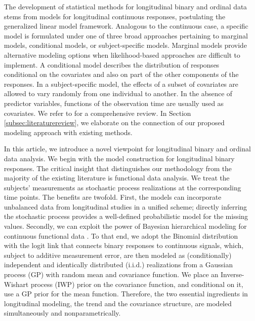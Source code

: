The development of statistical methods for longitudinal binary and ordinal data stems from 
models for longitudinal continuous responses, postulating the generalized linear model framework. 
Analogous to the continuous case, a specific model is formulated under one of three broad
approaches pertaining to marginal models, conditional models, or subject-specific models. 
Marginal models provide alternative modeling options when likelihood-based approaches are 
difficult to implement.
A conditional model describes the distribution of responses conditional on the covariates 
and also on part of the other components of the responses. In a subject-specific model, 
the effects of a subset of covariates are allowed to vary randomly from one individual 
to another. In the absence of predictor variables, functions of the observation time are 
usually used as covariates. We refer to \citet{Molenberghs2006} for a comprehensive review. 
In Section \ref{subsec:literaturereview}, we elaborate on the connection of our 
proposed modeling approach with existing methods.


In this article, we introduce a novel viewpoint for longitudinal binary and ordinal data 
analysis. %
We begin with the model construction for longitudinal binary responses. The critical insight 
that distinguishes our methodology from the majority of the existing literature is functional 
data analysis. We treat the subjects' measurements as stochastic process realizations at the 
corresponding time points. The benefits are twofold. First, the models can incorporate 
unbalanced data from longitudinal studies in a unified scheme; directly inferring the 
stochastic process provides a well-defined probabilistic model for the missing values. 
Secondly, we can exploit the power of Bayesian hierarchical modeling for continuous 
functional data \citep[e.g.,][]{Yang2016}. To that end, we adopt the Binomial distribution 
with the logit link that connects binary responses to continuous signals, which, subject to 
additive measurement error, are then modeled as (conditionally) independent and 
identically distributed (i.i.d.) realizations from a Gaussian process (GP) with 
random mean and covariance function. We place an Inverse-Wishart process (IWP) prior 
on the covariance function, and conditional on it, use a GP prior for the mean function. 
Therefore, the two essential ingredients in longitudinal modeling, the trend and the 
covariance structure, are modeled simultaneously and nonparametrically. 


